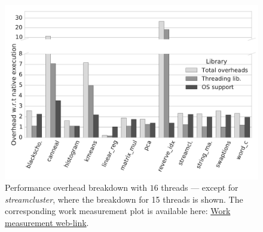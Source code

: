 
\begin{figure}[t]
\centering
\includegraphics[scale=0.25]{figure/benchmarks/times-16-threads.pdf}
\caption{Performance overhead breakdown with $16$ threads --- except for {\em streamcluster}, where the breakdown for 15 threads is shown. The corresponding work measurement plot is available here: \href{https://mic92.github.io/inspector/index.html\#graph4}{Work measurement web-link}.}
\label{fig:overheads-breakdown}
\end{figure}
